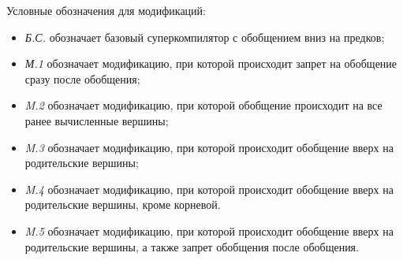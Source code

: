 \documentclass[xcolor=table]{beamer}
\begin{document}
\begin{frame}
Условные обозначения для модификаций:
\begin{itemize}
\item {\it Б.С.} обозначает базовый суперкомпилятор с обобщением вниз на предков;
\item {\it М.1 } обозначает модификацию, при которой происходит запрет на обобщение сразу после обобщения;
\item {\it M.2 } обозначает модификацию, при которой обобщение происходит на все ранее вычисленные вершины;
\item {\it M.3 } обозначает модификацию, при которой происходит обобщение вверх на родительские вершины;
\item {\it M.4 } обозначает модификацию, при которой происходит обобщение вверх на родительские вершины, кроме корневой.
\item {\it M.5 } обозначает модификацию, при которой происходит обобщение вверх на родительские вершины, а также запрет обобщения после обобщения.
\end{itemize}
\end{frame}
\end{document}
